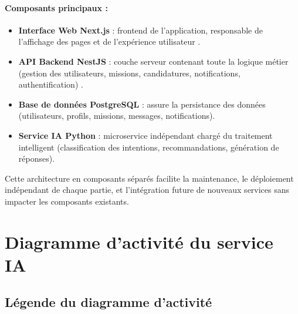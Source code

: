 \paragraph{Composants principaux :}
\begin{itemize}
    \item \textbf{Interface Web Next.js} : frontend de l'application, responsable de l'affichage des pages et de l'expérience utilisateur \cite{nextjs}.
    \item \textbf{API Backend NestJS} : couche serveur contenant toute la logique métier (gestion des utilisateurs, missions, candidatures, notifications, authentification) \cite{nestjs}.
    \item \textbf{Base de données PostgreSQL} : assure la persistance des données (utilisateurs, profils, missions, messages, notifications).
    \item \textbf{Service IA Python} : microservice indépendant chargé du traitement intelligent (classification des intentions, recommandations, génération de réponses).
\end{itemize}

Cette architecture en composants séparés facilite la maintenance, le déploiement indépendant de chaque partie, et l'intégration future de nouveaux services sans impacter les composants existants.

\section{Diagramme d'activité du service IA}

\subsection{Légende du diagramme d'activité}

